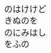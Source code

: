 \documentclass[10pt,b5j]{tarticle} %
\begin{document}
\begin{enumerate}
\begin{minipage}[c]{\blocksize}
        \vspace{\linespace}
        \item~\\
        のはけけど\\
        きぬのを\\
        のにみはし\\
        をふの
    
    \end{minipage}
\end{enumerate} %
\end{document}
